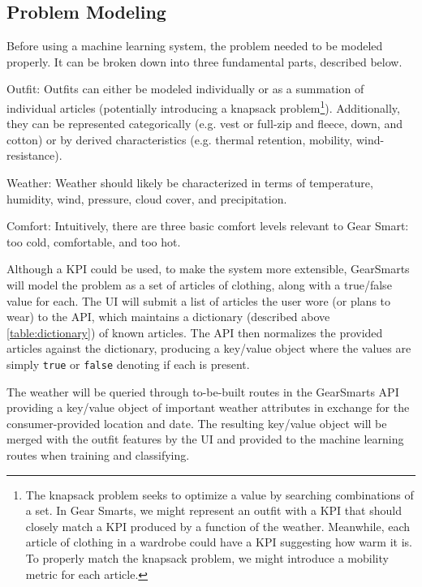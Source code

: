 \subsection{Problem Modeling}
Before using a machine learning system, the problem needed to be modeled properly. It can be broken down into three
fundamental parts, described below.

\begin{description}
  \item{Outfit:} Outfits can either be modeled individually or as a summation of individual articles (potentially introducing
  a knapsack problem\footnote{The knapsack problem seeks to optimize a value by searching combinations of a set. In Gear Smarts,
  we might represent an outfit with a KPI that should closely match a KPI produced by a function of the weather. Meanwhile, each
  article of clothing in a wardrobe could have a KPI suggesting how warm it is. To properly match the knapsack problem, we might
  introduce a mobility metric for each article.}).
  Additionally, they can be represented categorically (e.g. vest or full-zip and
  fleece, down, and cotton) or by derived characteristics (e.g. thermal retention, mobility, wind-resistance).
  \item{Weather:} Weather should likely be characterized in terms of temperature, humidity, wind, pressure,
  cloud cover, and precipitation.
  \item{Comfort:} Intuitively, there are three basic comfort levels relevant to Gear Smart: too cold, comfortable, and too hot.
\end{description}

Although a KPI could be used, to make the system more extensible, GearSmarts will model the problem as a set of
articles of clothing, along with a true/false value for each. The UI will submit a list of articles the user wore (or
plans to wear) to the API, which maintains a dictionary (described above \ref{table:dictionary}) of known articles. The
API then normalizes the provided articles against the dictionary, producing a key/value object where the values are
simply \texttt{true} or \texttt{false} denoting if each is present.

The weather will be queried through to-be-built routes in the GearSmarts API providing a key/value object of important
weather attributes in exchange for the consumer-provided location and date. The resulting key/value object will be
merged with the outfit features by the UI and provided to the machine learning routes when training and classifying.

